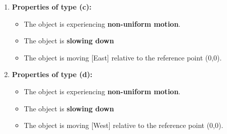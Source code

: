 \documentclass[12pt]{article}
\newcommand{\tx}[1]{\text{#1}}
\theoremstyle{break}
\begin{document}
\begin{enumerate}[label = (\alph*)]
	\item 

		\textbf{\large{Properties of type (c):}}
		\begin{itemize}
			\item The object is experiencing \textbf{non-uniform motion}.
			\item The object is \textbf{slowing down}
			\item The object is moving [East] relative to the reference point (0,0).
		\end{itemize}

	\item 

		\textbf{\large{Properties of type (d):}}
		\begin{itemize}
			\item The object is experiencing \textbf{non-uniform motion}.
			\item The object is \textbf{slowing down}
			\item The object is moving [West] relative to the reference point (0,0).
		\end{itemize}

\end{enumerate}
\end{document}
